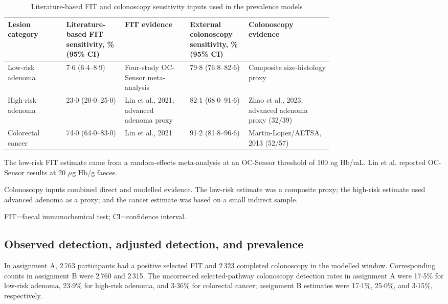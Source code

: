 \documentclass[10pt,a4paper]{article}
\renewcommand{\arraystretch}{1.12}
\newcommand{\dec}{\ensuremath{\cdot}}
\begin{document}
\begin{table}[p]
\centering
\caption{Literature-based FIT and colonoscopy sensitivity inputs used in the
prevalence models}
\label{tab:external}
\begin{threeparttable}
\scriptsize
\setlength{\tabcolsep}{4pt}
\renewcommand{\arraystretch}{1.13}
\begin{tabularx}{\linewidth}{@{}L{0.18\linewidth}L{0.18\linewidth}
L{0.20\linewidth}L{0.18\linewidth}Y@{}}
\toprule
\textbf{Lesion category} &
\textbf{Literature-based FIT sensitivity, \% (95\% CI)} &
\textbf{FIT evidence} &
\textbf{External colonoscopy sensitivity, \% (95\% CI)} &
\textbf{Colonoscopy evidence}\\
\midrule
Low-risk adenoma &
7\dec{}6 (6\dec{}4--8\dec{}9) &
Four-study OC-Sensor meta-analysis &
79\dec{}8 (76\dec{}8--82\dec{}6) &
Composite size-histology proxy\\
High-risk adenoma &
23\dec{}0 (20\dec{}0--25\dec{}0) &
Lin et al., 2021; advanced adenoma proxy &
82\dec{}1 (68\dec{}0--91\dec{}6) &
Zhao et al., 2023; advanced adenoma proxy (32/39)\\
Colorectal cancer &
74\dec{}0 (64\dec{}0--83\dec{}0) &
Lin et al., 2021 &
91\dec{}2 (81\dec{}8--96\dec{}6) &
Martin-Lopez/AETSA, 2013 (52/57)\\
\bottomrule
\end{tabularx}
\begin{tablenotes}[flushleft]
\footnotesize
\item[] The low-risk FIT estimate came from a random-effects meta-analysis at
an OC-Sensor threshold of 100 ng Hb/mL. Lin et al. reported OC-Sensor results
at 20 $\mu$g Hb/g faeces.
\item[] Colonoscopy inputs combined direct and modelled evidence. The
low-risk estimate was a composite proxy; the high-risk estimate used advanced
adenoma as a proxy; and the cancer estimate was based on a small indirect
sample.
\item[] FIT=faecal immunochemical test; CI=confidence interval.
\end{tablenotes}
\end{threeparttable}
\end{table}

\subsection*{Observed detection, adjusted detection, and prevalence}

In assignment A, 2\,763 participants had a positive selected FIT and 2\,323
completed colonoscopy in the modelled window. Corresponding counts in
assignment B were 2\,760 and 2\,315. The uncorrected selected-pathway
colonoscopy detection rates in assignment A were 17\dec{}5\% for low-risk
adenoma, 23\dec{}9\% for high-risk adenoma, and 3\dec{}36\% for colorectal
cancer; assignment B estimates were 17\dec{}1\%, 25\dec{}0\%, and
3\dec{}15\%, respectively.
\end{document}
